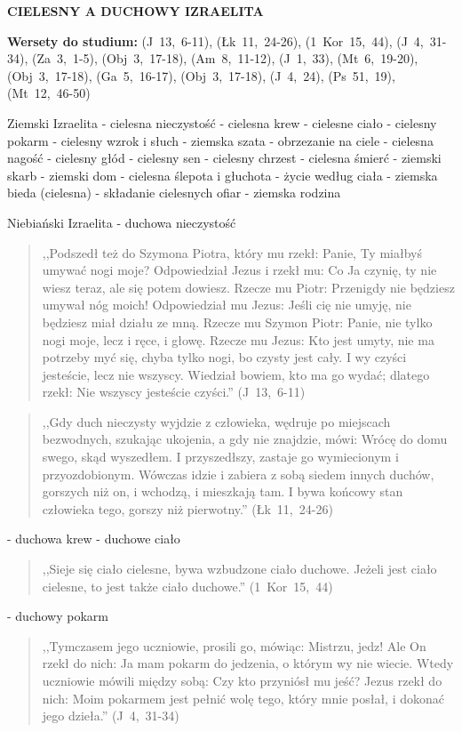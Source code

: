 \documentclass[10pt,a4paper,oneside]{article}
\begin{document}
\centerline{\textbf{\MakeUppercase{Cielesny a duchowy Izraelita}}}
\begin{center}
\textbf{Wersety do studium:} (J~13,~6-11), (Łk~11,~24-26), (1~Kor~15,~44), (J~4,~31-34), (Za~3,~1-5), (Obj~3,~17-18), (Am~8,~11-12), (J~1,~33), (Mt~6,~19-20), (Obj~3,~17-18), (Ga~5,~16-17), (Obj~3,~17-18), (J~4,~24), (Ps~51,~19), (Mt~12,~46-50)
\end{center}
Ziemski Izraelita
- cielesna nieczystość
- cielesna krew
- cielesne ciało
- cielesny pokarm
- cielesny wzrok i słuch
- ziemska szata
- obrzezanie na ciele
- cielesna nagość
- cielesny głód
- cielesny sen
- cielesny chrzest
- cielesna śmierć
- ziemski skarb
- ziemski dom
- cielesna ślepota i głuchota
- życie według ciała
- ziemska bieda (cielesna)
- składanie cielesnych ofiar
- ziemska rodzina

Niebiański Izraelita
- duchowa nieczystość
\begin{quote}
,,Podszedł też do Szymona Piotra, który mu rzekł: Panie, Ty miałbyś umywać nogi moje? Odpowiedział Jezus i rzekł mu: Co Ja czynię, ty nie wiesz teraz, ale się potem dowiesz. Rzecze mu Piotr: Przenigdy nie będziesz umywał nóg moich! Odpowiedział mu Jezus: Jeśli cię nie umyję, nie będziesz miał działu ze mną. Rzecze mu Szymon Piotr: Panie, nie tylko nogi moje, lecz i ręce, i głowę. Rzecze mu Jezus: Kto jest umyty, nie ma potrzeby myć się, chyba tylko nogi, bo czysty jest cały. I wy czyści jesteście, lecz nie wszyscy. Wiedział bowiem, kto ma go wydać; dlatego rzekł: Nie wszyscy jesteście czyści.'' (J~13,~6-11)
\end{quote}
\begin{quote}
,,Gdy duch nieczysty wyjdzie z człowieka, wędruje po miejscach bezwodnych, szukając ukojenia, a gdy nie znajdzie, mówi: Wrócę do domu swego, skąd wyszedłem. I przyszedłszy, zastaje go wymiecionym i przyozdobionym. Wówczas idzie i zabiera z sobą siedem innych duchów, gorszych niż on, i wchodzą, i mieszkają tam. I bywa końcowy stan człowieka tego, gorszy niż pierwotny.'' (Łk~11,~24-26)
\end{quote}
- duchowa krew
- duchowe ciało
\begin{quote}
,,Sieje się ciało cielesne, bywa wzbudzone ciało duchowe. Jeżeli jest ciało cielesne, to jest także ciało duchowe.'' (1~Kor~15,~44)
\end{quote}
- duchowy pokarm
\begin{quote}
,,Tymczasem jego uczniowie, prosili go, mówiąc: Mistrzu, jedz! Ale On rzekł do nich: Ja mam pokarm do jedzenia, o którym wy nie wiecie. Wtedy uczniowie mówili między sobą: Czy kto przyniósł mu jeść? Jezus rzekł do nich: Moim pokarmem jest pełnić wolę tego, który mnie posłał, i dokonać jego dzieła.'' (J~4,~31-34)
\end{quote}
\end{document}
